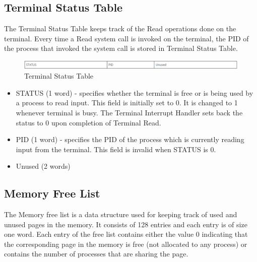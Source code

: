 \subsection {Terminal Status Table}
The Terminal Status Table keeps track of the Read operations done on the terminal. Every time a Read system call is invoked on the terminal, the PID of the process that invoked the system call is stored in Terminal Status Table. 
\begin{figure}[ht]
\centering
\includegraphics  [scale=0.55]{figures/ts.png}
\caption{\footnotesize Terminal Status Table}
\label{fig_1}
\end{figure}
\begin {itemize}

\item STATUS (1 word) - specifies whether the terminal is free or is being used by a process to read input. This field is initially set to 0. It is changed to 1 whenever terminal is busy. The Terminal Interrupt Handler sets back the status to 0 upon completion of Terminal Read.
\item PID (1 word) - specifies the PID of the process which is currently reading input from the terminal. This field is invalid when STATUS is 0.
\item Unused (2 words)
\end {itemize}
\subsection {Memory Free List}

The Memory free list is a data structure used for keeping track of used and unused pages in the memory. It consists of 128 entries and each entry is of size one word. Each entry of the free list contains either the value 0 indicating that the corresponding page in the memory is free (not allocated to any process) or contains the number of processes that are sharing the page. 
